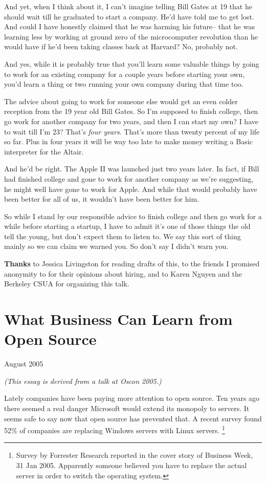 \documentclass[12pt]{book}
\begin{document}
And yet, when I think about it, I can't imagine telling Bill Gates at 19
that he should wait till he graduated to start a company. He'd have told
me to get lost. And could I have honestly claimed that he was harming
his future-- that he was learning less by working at ground zero of the
microcomputer revolution than he would have if he'd been taking classes
back at Harvard? No, probably not.

And yes, while it is probably true that you'll learn some valuable
things by going to work for an existing company for a couple years
before starting your own, you'd learn a thing or two running your own
company during that time too.

The advice about going to work for someone else would get an even colder
reception from the 19 year old Bill Gates. So I'm supposed to finish
college, then go work for another company for two years, and then I can
start my own? I have to wait till I'm 23? That's \emph{four years}.
That's more than twenty percent of my life so far. Plus in four years it
will be way too late to make money writing a Basic interpreter for the
Altair.

And he'd be right. The Apple II was launched just two years later. In
fact, if Bill had finished college and gone to work for another company
as we're suggesting, he might well have gone to work for Apple. And
while that would probably have been better for all of us, it wouldn't
have been better for him.

So while I stand by our responsible advice to finish college and then go
work for a while before starting a startup, I have to admit it's one of
those things the old tell the young, but don't expect them to listen to.
We say this sort of thing mainly so we can claim we warned you. So don't
say I didn't warn you.


\textbf{Thanks} to Jessica Livingston for reading drafts of this, to the
friends I promised anonymity to for their opinions about hiring, and to
Karen Nguyen and the Berkeley CSUA for organizing this talk.
\chapter{What Business Can Learn from Open Source}

August 2005

\emph{(This essay is derived from a talk at Oscon 2005.)}

Lately companies have been paying more attention to open source. Ten
years ago there seemed a real danger Microsoft would extend its monopoly
to servers. It seems safe to say now that open source has prevented
that. A recent survey found 52\% of companies are replacing Windows
servers with Linux servers. \footnote{Survey by Forrester Research reported in the cover story of
Business Week, 31 Jan 2005. Apparently someone believed you have to
replace the actual server in order to switch the operating system.}
\end{document}
